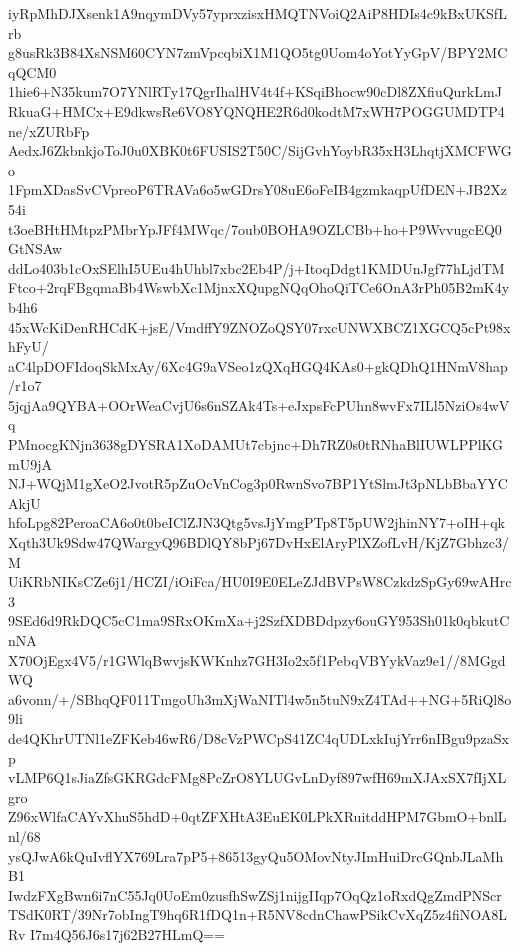 iyRpMhDJXsenk1A9nqymDVy57yprxzisxHMQTNVoiQ2AiP8HDIs4c9kBxUKSfLrb
g8usRk3B84XsNSM60CYN7zmVpcqbiX1M1QO5tg0Uom4oYotYyGpV/BPY2MCqQCM0
1hie6+N35kum7O7YNlRTy17QgrIhalHV4t4f+KSqiBhocw90cDl8ZXfiuQurkLmJ
RkuaG+HMCx+E9dkwsRe6VO8YQNQHE2R6d0kodtM7xWH7POGGUMDTP4ne/xZURbFp
AedxJ6ZkbnkjoToJ0u0XBK0t6FUSIS2T50C/SijGvhYoybR35xH3LhqtjXMCFWGo
1FpmXDasSvCVpreoP6TRAVa6o5wGDrsY08uE6oFeIB4gzmkaqpUfDEN+JB2Xz54i
t3oeBHtHMtpzPMbrYpJFf4MWqc/7oub0BOHA9OZLCBb+ho+P9WvvugcEQ0GtNSAw
ddLo403b1cOxSElhI5UEu4hUhbl7xbc2Eb4P/j+ItoqDdgt1KMDUnJgf77hLjdTM
Ftco+2rqFBgqmaBb4WswbXc1MjnxXQupgNQqOhoQiTCe6OnA3rPh05B2mK4yb4h6
45xWcKiDenRHCdK+jsE/VmdffY9ZNOZoQSY07rxcUNWXBCZ1XGCQ5cPt98xhFyU/
aC4lpDOFIdoqSkMxAy/6Xc4G9aVSeo1zQXqHGQ4KAs0+gkQDhQ1HNmV8hap/r1o7
5jqjAa9QYBA+OOrWeaCvjU6s6nSZAk4Ts+eJxpsFcPUhn8wvFx7ILl5NziOs4wVq
PMnocgKNjn3638gDYSRA1XoDAMUt7cbjnc+Dh7RZ0s0tRNhaBlIUWLPPlKGmU9jA
NJ+WQjM1gXeO2JvotR5pZuOcVnCog3p0RwnSvo7BP1YtSlmJt3pNLbBbaYYCAkjU
hfoLpg82PeroaCA6o0t0beIClZJN3Qtg5vsJjYmgPTp8T5pUW2jhinNY7+oIH+qk
Xqth3Uk9Sdw47QWargyQ96BDlQY8bPj67DvHxElAryPlXZofLvH/KjZ7Gbhzc3/M
UiKRbNIKsCZe6j1/HCZI/iOiFca/HU0I9E0ELeZJdBVPsW8CzkdzSpGy69wAHrc3
9SEd6d9RkDQC5cC1ma9SRxOKmXa+j2SzfXDBDdpzy6ouGY953Sh01k0qbkutCnNA
X70OjEgx4V5/r1GWlqBwvjsKWKnhz7GH3Io2x5f1PebqVBYykVaz9e1//8MGgdWQ
a6vonn/+/SBhqQF011TmgoUh3mXjWaNITl4w5n5tuN9xZ4TAd++NG+5RiQl8o9li
de4QKhrUTNl1eZFKeb46wR6/D8cVzPWCpS41ZC4qUDLxkIujYrr6nIBgu9pzaSxp
vLMP6Q1sJiaZfsGKRGdcFMg8PcZrO8YLUGvLnDyf897wfH69mXJAxSX7fIjXLgro
Z96xWlfaCAYvXhuS5hdD+0qtZFXHtA3EuEK0LPkXRuitddHPM7GbmO+bnlLnl/68
ysQJwA6kQuIvflYX769Lra7pP5+86513gyQu5OMovNtyJImHuiDrcGQnbJLaMhB1
IwdzFXgBwn6i7nC55Jq0UoEm0zusfhSwZSj1nijgIIqp7OqQz1oRxdQgZmdPNScr
TSdK0RT/39Nr7obIngT9hq6R1fDQ1n+R5NV8cdnChawPSikCvXqZ5z4fiNOA8LRv
I7m4Q56J6s17j62B27HLmQ==
